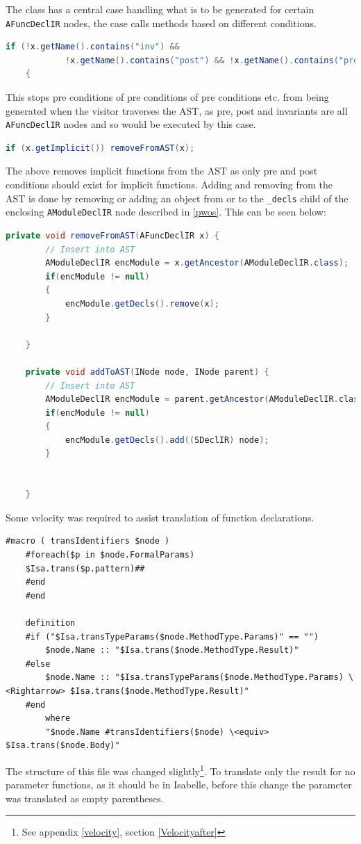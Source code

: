 	The class has a central case handling what is to be generated for certain \lstinline[language=Java]{AFuncDeclIR} nodes, the case calls methods based on different conditions.
	\begin{lstlisting}[language=Java]
	if (!x.getName().contains("inv") && 
			!x.getName().contains("post") && !x.getName().contains("pre"))
	{
	\end{lstlisting}
	This stops pre conditions of pre conditions of pre conditions etc. from being generated when the visitor traverses the AST, as pre, post and invariants are all \lstinline[language=Java]{AFuncDeclIR} nodes and so would be executed by this case. 
	\begin{lstlisting}[language=Java]
	if (x.getImplicit()) removeFromAST(x);
	\end{lstlisting}
	The above removes implicit functions from the AST as only pre and post conditions should exist for implicit functions. Adding and removing from the AST is done by removing or adding an object from or to the \lstinline[language=Java]{_decls} child of the enclosing \lstinline[language=Java]{AModuleDeclIR} node described in \ref{pwos}. This can be seen below:
	\begin{lstlisting}[language=Java]
	private void removeFromAST(AFuncDeclIR x) {
    	// Insert into AST
        AModuleDeclIR encModule = x.getAncestor(AModuleDeclIR.class);
        if(encModule != null)
        {
            encModule.getDecls().remove(x);
        }
		
	}

    private void addToAST(INode node, INode parent) {
    	// Insert into AST
        AModuleDeclIR encModule = parent.getAncestor(AModuleDeclIR.class);
        if(encModule != null)
        {
            encModule.getDecls().add((SDeclIR) node);
        }

		
	}
	\end{lstlisting}


	Some velocity was required to assist translation of function declarations.
	\begin{lstlisting}[language=Velocity]
	#macro ( transIdentifiers $node )
	#foreach($p in $node.FormalParams)
	$Isa.trans($p.pattern)##
	#end
	#end

	definition
	#if ("$Isa.transTypeParams($node.MethodType.Params)" == "")
		$node.Name :: "$Isa.trans($node.MethodType.Result)"
	#else
		$node.Name :: "$Isa.transTypeParams($node.MethodType.Params) \<Rightarrow> $Isa.trans($node.MethodType.Result)"
	#end
	    where
	    "$node.Name #transIdentifiers($node) \<equiv> $Isa.trans($node.Body)"
	\end{lstlisting}
	The structure of this file was changed slightly\footnote{See appendix \ref{velocity}, section \ref{Velocityafter}}. To translate only the result for no parameter functions, as it should be in Isabelle, before this change the parameter was translated as empty parentheses.

